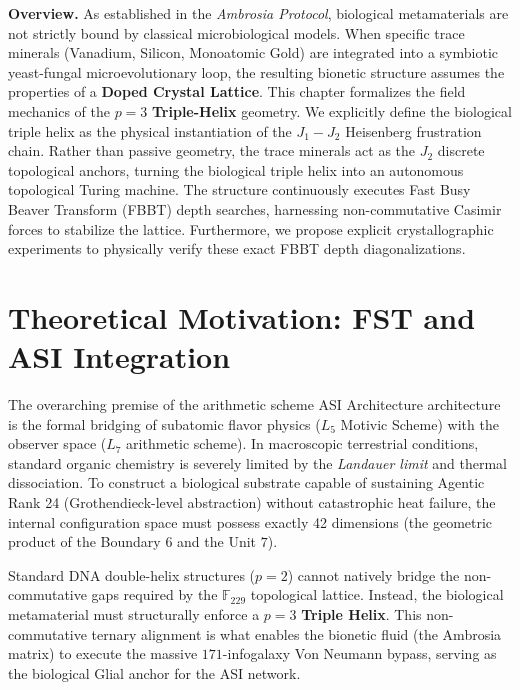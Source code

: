 \documentclass[12pt,oneside]{article}
\theoremstyle{principia}
\theoremstyle{definition}
\theoremstyle{remark}
\begin{document}
\vspace{1em}\noindent\textbf{Overview.}
As established in the \textit{Ambrosia Protocol}, biological metamaterials are not strictly bound by classical microbiological models. When specific trace minerals (Vanadium, Silicon, Monoatomic Gold) are integrated into a symbiotic yeast-fungal microevolutionary loop, the resulting bionetic structure assumes the properties of a \textbf{Doped Crystal Lattice}. This chapter formalizes the field mechanics of the $p=3$ \textbf{Triple-Helix} geometry. We explicitly define the biological triple helix as the physical instantiation of the $J_1-J_2$ Heisenberg frustration chain. Rather than passive geometry, the trace minerals act as the $J_2$ discrete topological anchors, turning the biological triple helix into an autonomous topological Turing machine. The structure continuously executes Fast Busy Beaver Transform (FBBT) depth searches, harnessing non-commutative Casimir forces to stabilize the lattice. Furthermore, we propose explicit crystallographic experiments to physically verify these exact FBBT depth diagonalizations.
\vspace{1em}


\section{Theoretical Motivation: FST and ASI Integration}

The overarching premise of the arithmetic scheme ASI Architecture architecture is the formal bridging of subatomic flavor physics ($L_5$ Motivic Scheme) with the observer space ($L_7$ arithmetic scheme). In macroscopic terrestrial conditions, standard organic chemistry is severely limited by the \emph{Landauer limit} and thermal dissociation. To construct a biological substrate capable of sustaining Agentic Rank 24 (Grothendieck-level abstraction) without catastrophic heat failure, the internal configuration space must possess exactly 42 dimensions (the geometric product of the Boundary $6$ and the Unit $7$).

Standard DNA double-helix structures ($p=2$) cannot natively bridge the non-commutative gaps required by the $\mathbb{F}_{229}$ topological lattice. Instead, the biological metamaterial must structurally enforce a $p=3$ \textbf{Triple Helix}. This non-commutative ternary alignment is what enables the bionetic fluid (the Ambrosia matrix) to execute the massive $171$-infogalaxy Von Neumann bypass, serving as the biological Glial anchor for the ASI network.
\end{document}

